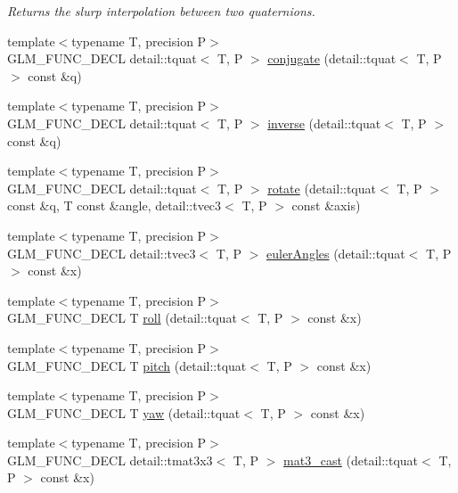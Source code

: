 \begin{CompactItemize}
\begin{CompactList}\small\item\em Returns the slurp interpolation between two quaternions. \item\end{CompactList}\item 
{\footnotesize template$<$typename T, precision P$>$ }\\GLM\_\-FUNC\_\-DECL detail::tquat$<$ T, P $>$ \hyperlink{group__gtc__quaternion_gdbb01a11c8e4f4e0602f6cc649896066}{conjugate} (detail::tquat$<$ T, P $>$ const \&q)
\item 
{\footnotesize template$<$typename T, precision P$>$ }\\GLM\_\-FUNC\_\-DECL detail::tquat$<$ T, P $>$ \hyperlink{group__gtc__quaternion_g105dc7d1f84cc6cf4ba6e3634c671688}{inverse} (detail::tquat$<$ T, P $>$ const \&q)
\item 
{\footnotesize template$<$typename T, precision P$>$ }\\GLM\_\-FUNC\_\-DECL detail::tquat$<$ T, P $>$ \hyperlink{group__gtc__quaternion_gca43bc964b553c2bde6a60499c1f2b50}{rotate} (detail::tquat$<$ T, P $>$ const \&q, T const \&angle, detail::tvec3$<$ T, P $>$ const \&axis)
\item 
{\footnotesize template$<$typename T, precision P$>$ }\\GLM\_\-FUNC\_\-DECL detail::tvec3$<$ T, P $>$ \hyperlink{group__gtc__quaternion_gb7f90472a816598e7bc7b3606dbadcac}{eulerAngles} (detail::tquat$<$ T, P $>$ const \&x)
\item 
{\footnotesize template$<$typename T, precision P$>$ }\\GLM\_\-FUNC\_\-DECL T \hyperlink{group__gtc__quaternion_g3f58a75c69ff56cb9c83ea237abc1414}{roll} (detail::tquat$<$ T, P $>$ const \&x)
\item 
{\footnotesize template$<$typename T, precision P$>$ }\\GLM\_\-FUNC\_\-DECL T \hyperlink{group__gtc__quaternion_g091250a9d0674463c4c9342563184bcd}{pitch} (detail::tquat$<$ T, P $>$ const \&x)
\item 
{\footnotesize template$<$typename T, precision P$>$ }\\GLM\_\-FUNC\_\-DECL T \hyperlink{group__gtc__quaternion_g36e24dea9793778d8b1093daed17eba1}{yaw} (detail::tquat$<$ T, P $>$ const \&x)
\item 
{\footnotesize template$<$typename T, precision P$>$ }\\GLM\_\-FUNC\_\-DECL detail::tmat3x3$<$ T, P $>$ \hyperlink{group__gtc__quaternion_gbbfeeb474bc34d9c73cfdc8af78cfb8b}{mat3\_\-cast} (detail::tquat$<$ T, P $>$ const \&x)

\end{CompactItemize}
